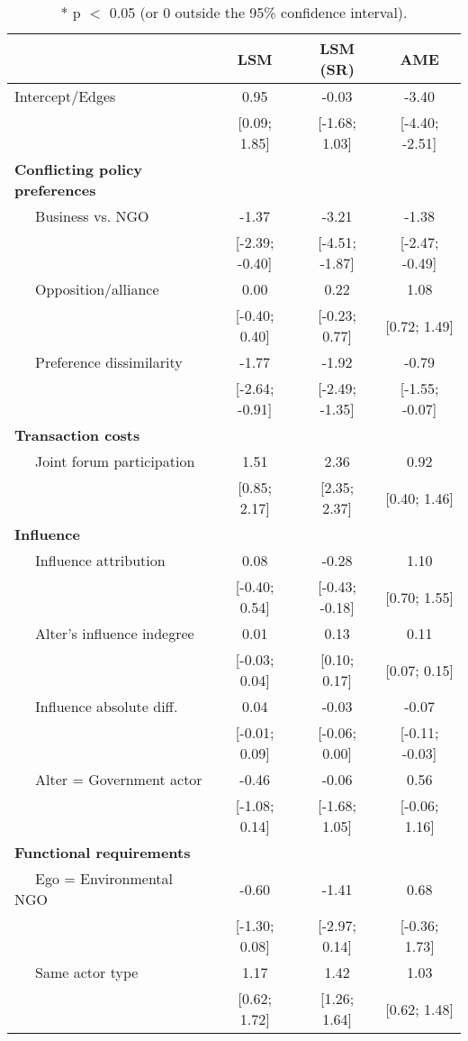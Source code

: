 \begin{table}[ht]
\centering
\begingroup\tiny
\begin{tabular}{lccc}
   & LSM & LSM (SR) & AME \\ 
  \hline
\hline
Intercept/Edges & 0.95 & -0.03 & -3.40 \\ 
   & [0.09; 1.85] & [-1.68; 1.03] & [-4.40; -2.51] \\ 
  \textbf{Conflicting policy preferences} &  &  &  \\ 
  $\;\;\;\;$ Business vs. NGO & -1.37 & -3.21 & -1.38 \\ 
   & [-2.39; -0.40] & [-4.51; -1.87] & [-2.47; -0.49] \\ 
  $\;\;\;\;$ Opposition/alliance & 0.00 & 0.22 & 1.08 \\ 
   & [-0.40; 0.40] & [-0.23; 0.77] & [0.72; 1.49] \\ 
  $\;\;\;\;$ Preference dissimilarity & -1.77 & -1.92 & -0.79 \\ 
   & [-2.64; -0.91] & [-2.49; -1.35] & [-1.55; -0.07] \\ 
  \textbf{Transaction costs} &  &  &  \\ 
  $\;\;\;\;$ Joint forum participation & 1.51 & 2.36 & 0.92 \\ 
   & [0.85; 2.17] & [2.35; 2.37] & [0.40; 1.46] \\ 
  \textbf{Influence} &  &  &  \\ 
  $\;\;\;\;$ Influence attribution & 0.08 & -0.28 & 1.10 \\ 
   & [-0.40; 0.54] & [-0.43; -0.18] & [0.70; 1.55] \\ 
  $\;\;\;\;$ Alter's influence indegree & 0.01 & 0.13 & 0.11 \\ 
   & [-0.03; 0.04] & [0.10; 0.17] & [0.07; 0.15] \\ 
  $\;\;\;\;$ Influence absolute diff. & 0.04 & -0.03 & -0.07 \\ 
   & [-0.01; 0.09] & [-0.06; 0.00] & [-0.11; -0.03] \\ 
  $\;\;\;\;$ Alter = Government actor & -0.46 & -0.06 & 0.56 \\ 
   & [-1.08; 0.14] & [-1.68; 1.05] & [-0.06; 1.16] \\ 
  \textbf{Functional requirements} &  &  &  \\ 
  $\;\;\;\;$ Ego = Environmental NGO & -0.60 & -1.41 & 0.68 \\ 
   & [-1.30; 0.08] & [-2.97; 0.14] & [-0.36; 1.73] \\ 
  $\;\;\;\;$ Same actor type & 1.17 & 1.42 & 1.03 \\ 
   & [0.62; 1.72] & [1.26; 1.64] & [0.62; 1.48] \\ 
   \hline
\hline
\end{tabular}
\endgroup
\caption{* p $<$ 0.05 (or 0 outside the 95\% confidence interval).} 
\label{tab:regTable_latSpace}
\end{table}
